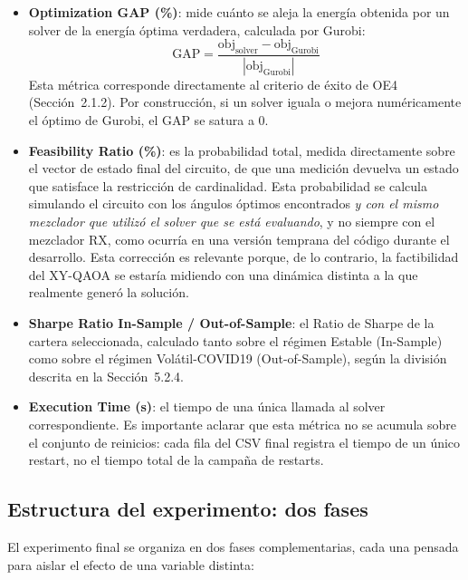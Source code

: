 \begin{itemize}
    \item \textbf{Optimization GAP (\%)}: mide cuánto se aleja la energía obtenida por un solver de la energía óptima verdadera, calculada por Gurobi:
    \begin{equation}
        \text{GAP} = \frac{\text{obj}_{\text{solver}} - \text{obj}_{\text{Gurobi}}}{|\text{obj}_{\text{Gurobi}}|}
        \label{eq:gap}
    \end{equation}
    Esta métrica corresponde directamente al criterio de éxito de OE4 (Sección~2.1.2). Por construcción, si un solver iguala o mejora numéricamente el óptimo de Gurobi, el GAP se satura a 0.
    \item \textbf{Feasibility Ratio (\%)}: es la probabilidad total, medida directamente sobre el vector de estado final del circuito, de que una medición devuelva un estado que satisface la restricción de cardinalidad. Esta probabilidad se calcula simulando el circuito con los ángulos óptimos encontrados \emph{y con el mismo mezclador que utilizó el solver que se está evaluando}, y no siempre con el mezclador RX, como ocurría en una versión temprana del código durante el desarrollo. Esta corrección es relevante porque, de lo contrario, la factibilidad del XY-QAOA se estaría midiendo con una dinámica distinta a la que realmente generó la solución.
    \item \textbf{Sharpe Ratio In-Sample / Out-of-Sample}: el Ratio de Sharpe de la cartera seleccionada, calculado tanto sobre el régimen Estable (In-Sample) como sobre el régimen Volátil-COVID19 (Out-of-Sample), según la división descrita en la Sección~5.2.4.
    \item \textbf{Execution Time (s)}: el tiempo de una única llamada al solver correspondiente. Es importante aclarar que esta métrica no se acumula sobre el conjunto de reinicios: cada fila del CSV final registra el tiempo de un único restart, no el tiempo total de la campaña de restarts.
\end{itemize}

\subsection{Estructura del experimento: dos fases}

El experimento final se organiza en dos fases complementarias, cada una pensada para aislar el efecto de una variable distinta:

